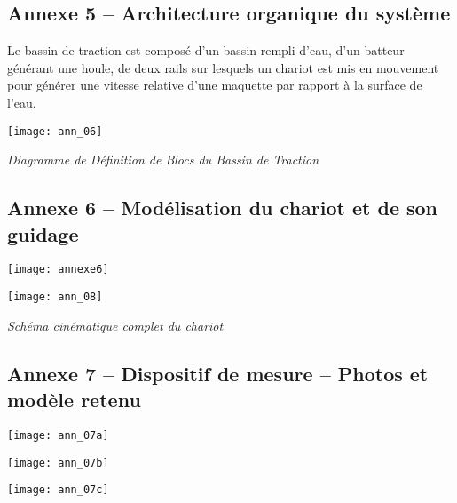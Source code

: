 \subsection*{Annexe 5 -- Architecture organique du système}
Le bassin de traction est composé d'un bassin rempli d'eau, d'un batteur générant une houle, de deux rails 
sur lesquels un chariot est mis en mouvement pour générer une vitesse relative d'une maquette par 
rapport à la surface de l'eau. 

\begin{center}
\texttt{[image: ann\_06]}

\textit{Diagramme de Définition de Blocs du Bassin de Traction }
\end{center}

\subsection*{Annexe 6 -- Modélisation du chariot et de son guidage}
\begin{center}
\texttt{[image: annexe6]}
\end{center}

\begin{center}
\texttt{[image: ann\_08]}

\textit{Schéma cinématique complet du chariot }
\end{center}
\subsection*{Annexe 7 -- Dispositif de mesure -- Photos et modèle retenu}

\begin{center}
\texttt{[image: ann\_07a]}
\end{center}

\vspace{1cm}

\begin{center}
\texttt{[image: ann\_07b]}
\end{center}

\vspace{1cm}

\begin{center}
\texttt{[image: ann\_07c]}
\end{center}
